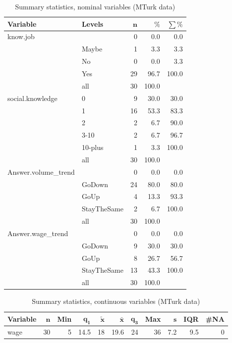 \documentclass[a4paper,10pt]{article}\usepackage[]{graphicx}\usepackage[]{color}
\begin{document}
\begin{table}[ht]
\centering
{\footnotesize
\begin{tabular}{ll|rrr}
 \textbf{Variable} & \textbf{Levels} & $\mathbf{n}$ & $\mathbf{\%}$ & $\mathbf{\sum \%}$ \\ 
  \hline
know.job &  & 0 & 0.0 & 0.0 \\ 
   & Maybe & 1 & 3.3 & 3.3 \\ 
   & No & 0 & 0.0 & 3.3 \\ 
   & Yes & 29 & 96.7 & 100.0 \\ 
   \hline
 & all & 30 & 100.0 &  \\ 
   \hline
\hline
social.knowledge & 0 & 9 & 30.0 & 30.0 \\ 
   & 1 & 16 & 53.3 & 83.3 \\ 
   & 2 & 2 & 6.7 & 90.0 \\ 
   & 3-10 & 2 & 6.7 & 96.7 \\ 
   & 10-plus & 1 & 3.3 & 100.0 \\ 
   \hline
 & all & 30 & 100.0 &  \\ 
   \hline
\hline
Answer.volume\_trend &  & 0 & 0.0 & 0.0 \\ 
   & GoDown & 24 & 80.0 & 80.0 \\ 
   & GoUp & 4 & 13.3 & 93.3 \\ 
   & StayTheSame & 2 & 6.7 & 100.0 \\ 
   \hline
 & all & 30 & 100.0 &  \\ 
   \hline
\hline
Answer.wage\_trend &  & 0 & 0.0 & 0.0 \\ 
   & GoDown & 9 & 30.0 & 30.0 \\ 
   & GoUp & 8 & 26.7 & 56.7 \\ 
   & StayTheSame & 13 & 43.3 & 100.0 \\ 
   \hline
 & all & 30 & 100.0 &  \\ 
   \hline
\hline
\end{tabular}
}
\caption{Summary statistics, nominal variables (MTurk data)} 
\label{tab1:43-5050}
\end{table}
\begin{table}[ht]
\centering
{\footnotesize
\begin{tabular}{lrrrrrrrrrr}
 \textbf{Variable} & $\mathbf{n}$ & \textbf{Min} & $\mathbf{q_1}$ & $\mathbf{\widetilde{x}}$ & $\mathbf{\bar{x}}$ & $\mathbf{q_3}$ & \textbf{Max} & $\mathbf{s}$ & \textbf{IQR} & \textbf{\#NA} \\ 
  \hline
wage & 30 & 5 & 14.5 & 18 & 19.6 & 24 & 36 & 7.2 & 9.5 & 0 \\ 
  \end{tabular}
}
\caption{Summary statistics, continuous variables (MTurk data)} 
\label{tab2:43-5050}
\end{table}
\end{document}

